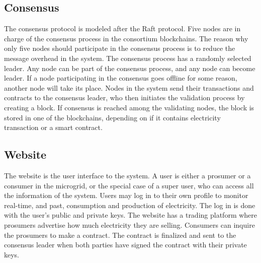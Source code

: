 \subsection{Consensus}
The consensus protocol is modeled after the Raft protocol. Five nodes are in charge of the consensus process in the consortium blockchains. The reason why only five nodes should participate in the consensus process is to reduce the message overhead in the system. The consensus process has a randomly selected leader. Any node can be part of the consensus process, and any node can become leader. If a node participating in the consensus goes offline for some reason, another node will take its place. Nodes in the system send their transactions and contracts to the consensus leader, who then initiates the validation process by creating a block. If consensus is reached among the validating nodes, the block is stored in one of the blockchains, depending on if it contains electricity transaction or a smart contract.

\subsection{Website}
The website is the user interface to the system. A user is either a prosumer or a consumer in the microgrid, or the special case of a super user, who can access all the information of the system. Users may log in to their own profile to monitor real-time, and past, consumption and production of electricity. The log in is done with the user's public and private keys. The website has a trading platform where prosumers advertise how much electricity they are selling. Consumers can inquire the prosumers to make a contract. The contract is finalized and sent to the consensus leader when both parties have signed the contract with their private keys.
